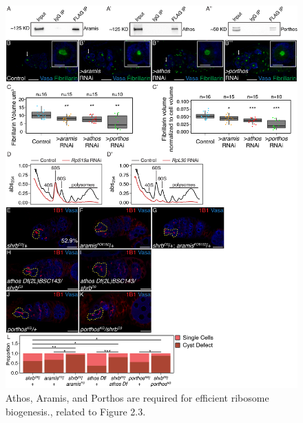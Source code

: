 \documentclass[12pt,oneside]{reedthesis}
\begin{document}
\begin{figure}

{\centering \includegraphics[width=6.5 in,height=8.9375 in]{./figure/Ribosome Biogenesis/Ribosome Biogenesis 2S} 

}

\caption[Athos, Aramis, and Porthos are required for efficient ribosome biogenesis., related to Figure 2.3.]{Athos, Aramis, and Porthos are required for efficient ribosome biogenesis., related to Figure 2.3.}\label{fig:unnamed-chunk-9}
\end{figure}
\textbf{\hfill\break
}
\end{document}
